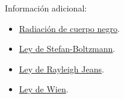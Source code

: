 \documentclass[10pt,letterpaper]{article}
\begin{document}
Información adicional:
\begin{itemize}
\item \href{http://en.wikipedia.org/wiki/Black-body_radiation#Equations}{Radiación de cuerpo negro}.
\item \href{http://en.wikipedia.org/wiki/Stefan%E2%80%93Boltzmann_law#Derivation_from_Planck.27s_law}{Ley de Stefan-Boltzmann}.
\item \href{http://en.wikipedia.org/wiki/Rayleigh%E2%80%93Jeans_law}{Ley de Rayleigh Jeans}.
\item \href{http://en.wikipedia.org/wiki/Wien%27s_displacement_law}{Ley de Wien}.
\end{itemize}
\end{document}

